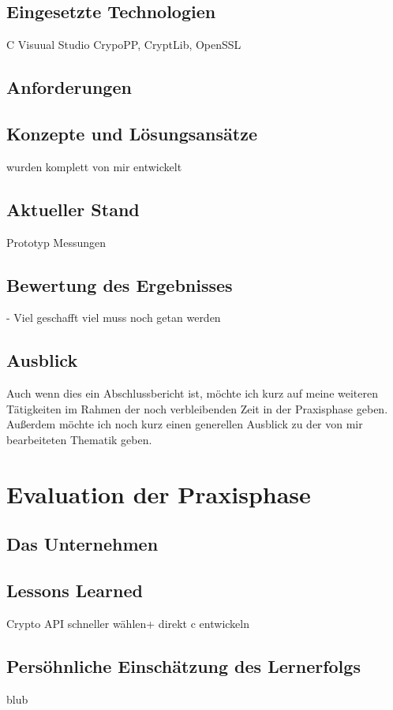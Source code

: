 \subsection{Eingesetzte Technologien}
C 
Visuual Studio 
CrypoPP, CryptLib, OpenSSL


\subsection{Anforderungen}
\subsection{Konzepte und Lösungsansätze}
wurden komplett von mir entwickelt

\subsection{Aktueller Stand} %
Prototyp 
Messungen
\subsection{Bewertung des Ergebnisses} 

- Viel geschafft 
viel muss noch getan werden
\subsection{Ausblick}
Auch wenn dies ein Abschlussbericht ist, möchte ich kurz auf meine weiteren Tätigkeiten im Rahmen der noch verbleibenden Zeit in der Praxisphase geben. Außerdem möchte ich noch kurz einen generellen Ausblick zu der von mir bearbeiteten Thematik geben. 

\section{Evaluation der Praxisphase}
\subsection{Das Unternehmen}
\subsection{Lessons Learned}
Crypto API schneller wählen+
direkt c entwickeln
\subsection{Persöhnliche Einschätzung des Lernerfolgs}



blub